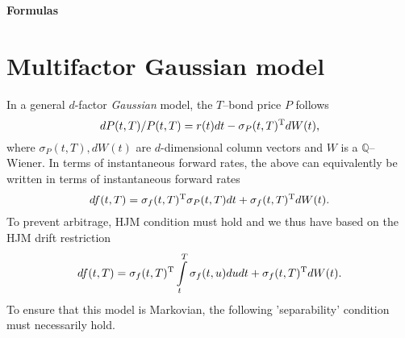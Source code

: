 \documentclass[11pt,a4paper]{article}
\numberwithin{equation}{section}
\begin{document}
\begin{center}
{\LARGE \textbf{Formulas}}
\end{center}

\section{Multifactor Gaussian model}
In a general $d$-factor \textit{Gaussian} model, the $T$--bond price $P$ follows
\begin{equation}\label{eq:bond_price_gaussian_2f}
  dP(t,T)/P(t,T) = r(t)dt - {\sigma _P}{(t,T)^{\rm{T}}}dW(t),
\end{equation}
where ${\sigma _P}(t,T), dW(t)$ are $d$-dimensional column vectors and $W$ is a $\mathbb{Q}$--Wiener. In terms of instantaneous forward rates, the above can equivalently be written in terms of instantaneous forward rates
\begin{equation*}
  df(t,T) = {\sigma _f}{(t,T)^{\rm{T}}}{\sigma _P}(t,T)dt + {\sigma _f}{(t,T)^{\rm{T}}}dW(t).
\end{equation*}
To prevent arbitrage, HJM condition must hold and we thus have based on the HJM drift restriction
\begin{equation*}
  df(t,T) = {\sigma _f}{(t,T)^{\rm{T}}}\int\limits_t^T {{\sigma _f}(t,u)du} dt + {\sigma _f}{(t,T)^{\rm{T}}}dW(t).
\end{equation*}
To ensure that this model is Markovian, the following 'separability' condition must necessarily hold.
\end{document}
